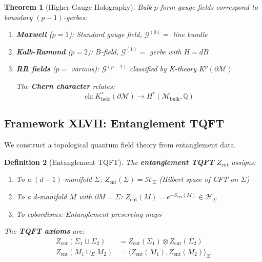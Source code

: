 \documentclass[12pt,a4paper]{article}
\newtheorem{theorem}{Theorem}[section]
\newtheorem{definition}[theorem]{Definition}
\begin{document}
\begin{theorem}[Higher Gauge Holography]\label{thm:higher-gauge}
Bulk $p$-form gauge fields correspond to boundary $(p-1)$-gerbes:
\begin{enumerate}
    \item \textbf{Maxwell} ($p=1$): Standard gauge field, $\mathcal{G}^{(0)} = $ line bundle
    \item \textbf{Kalb-Ramond} ($p=2$): $B$-field, $\mathcal{G}^{(1)} = $ gerbe with $H = dB$
    \item \textbf{RR fields} ($p=$ various): $\mathcal{G}^{(p-1)}$ classified by K-theory $K^{p}(\partial\mathcal{M})$
    
    The \textbf{Chern character} relates:
    \begin{equation}
    \text{ch}: K^*_{\text{holo}}(\partial\mathcal{M}) \to H^*(\mathcal{M}_{\text{bulk}}, \mathbb{Q})
    \end{equation}
\end{enumerate}
\end{theorem}

\subsection{Framework XLVII: Entanglement TQFT}

We construct a topological quantum field theory from entanglement data.

\begin{definition}[Entanglement TQFT]\label{def:ent-tqft}
The \textbf{entanglement TQFT} $Z_{\text{ent}}$ assigns:
\begin{enumerate}
    \item To a $(d-1)$-manifold $\Sigma$: $Z_{\text{ent}}(\Sigma) = \mathcal{H}_{\Sigma}$ (Hilbert space of CFT on $\Sigma$)
    \item To a $d$-manifold $M$ with $\partial M = \Sigma$: $Z_{\text{ent}}(M) = e^{-S_{\text{ent}}(M)} \in \mathcal{H}_\Sigma$
    \item To cobordisms: Entanglement-preserving maps
\end{enumerate}

The \textbf{TQFT axioms} are:
\begin{align}
Z_{\text{ent}}(\Sigma_1 \sqcup \Sigma_2) &= Z_{\text{ent}}(\Sigma_1) \otimes Z_{\text{ent}}(\Sigma_2) \\
Z_{\text{ent}}(M_1 \cup_\Sigma M_2) &= \langle Z_{\text{ent}}(M_1), Z_{\text{ent}}(M_2) \rangle_\Sigma
\end{align}
\end{definition}
\end{document}

